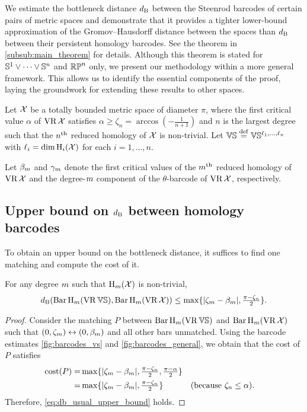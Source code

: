 We estimate the bottleneck distance $\db$ between the Steenrod barcodes of certain pairs of metric spaces and demonstrate that it provides a tighter lower-bound approximation of the Gromov–Hausdorff distance between the spaces than $\db$ between their persistent homology barcodes.
See the theorem in \cref{subsub:main_theorem} for details.
Although this theorem is stated for $\bS^1\vee\dots\vee \bS^n$ and $\rp^n$ only, we present our methodology within a more general framework.
This allows us to identify the essential components of the proof, laying the groundwork for extending these results to other spaces.

Let $\cX$ be a totally bounded metric space of diameter $\pi$, where the first critical value $\alpha$ of $\VR\cX$ satisfies $\alpha \geq \zeta_n = \arccos{(-\tfrac{1}{n+1})}$ and $n$ is the largest degree such that the $n^\th$ reduced homology of $\cX$ is non-trivial.
Let $\VS \defeq \VS^{\ell_1, \dots, \ell_n}$ with $\ell_i = \dim \opH_i(\cX)$ for each $i=1, \dots, n$.

Let $\beta_\degp$ and $\gamma_\degp$ denote the first critical values of the $\degp^\th$ reduced homology of $\VR\cX$ and the degree-$\degp$ component of the $\theta$-barcode of $\VR\cX$, respectively.

\subsection{Upper bound on $\db$ between homology barcodes}
\label{subsub:db_upper_bound}

To obtain an upper bound on the bottleneck distance, it suffices to find one matching and compute the cost of it. 

\medskip\proposition
For any degree $\degp$ such that $\opH_\degp(\cX)$ is non-trivial,
\begin{equation}\label{eq:db_usual_upper_bound}
    \db(\Hbarc[\field]{\degp}{\VS}, \Hbarc[\field]{\degp}{\cX})
    \leq \max\{|\zeta_\degp  - \beta_\degp |, \tfrac{\pi - \zeta_n}{2}\}.
\end{equation}

\begin{proof}
    Consider the matching $P$ between $\Hbarc[\field]{\degp}{\VS}$ and $\Hbarc[\field]{\degp}{\cX}$ such that $(0,\zeta_\degp ) \leftrightarrow (0, \beta_\degp )$ and all other bars unmatched. 
    Using the barcode estimates \cref{fig:barcodes_vs} and \cref{fig:barcodes_general}, we obtain that the cost of $P$ satisfies
    \begin{align*}
        \cost(P) 
        = & \max\{|\zeta_\degp  - \beta_\degp |, \tfrac{\pi - \zeta_n}{2}, \tfrac{\pi - \alpha}{2}\} \\
        = & \max\{|\zeta_\degp  - \beta_\degp |, \tfrac{\pi - \zeta_n}{2}\} && \mbox{(because $\zeta_n \leq \alpha$)}.
    \end{align*}
    Therefore, \cref{eq:db_usual_upper_bound} holds.
\end{proof}


